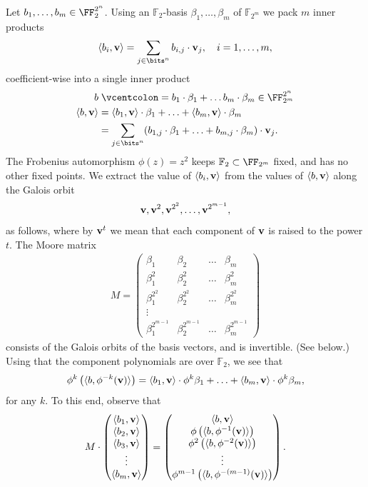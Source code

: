 \documentclass[11pt,letterpaper,usenames,dvipsnames]{article}
\begin{document}
Let $b_1,\ldots, b_m \in \FF_2^{2^n}$.
Using an $\mathbb F_2$-basis $\beta_1,\ldots, \beta_{m}$ of $\mathbb F_{2^m}$ we
pack $m$ inner products %
\[
\langle b_i, \vv\rangle = \sum_{j\in \bits^{n}} b_{i,j} \cdot \vv_j, 
\quad i = 1, \ldots, m,
\]
coefficient-wise into a single inner product 
\begin{align*}
b&\defeq b_1\cdot \beta_1 + \ldots b_m \cdot \beta_m \in \FF_{2^m}^{2^n}\\
\langle b, \vv\rangle &= \langle b_1, \vv\rangle \cdot \beta_1 + \ldots + \langle b_m, \vv\rangle \cdot\beta_m
\\
&= \sum_{j\in \bits^n} (b_{1,j}\cdot \beta_1 + \ldots + b_{m,j}\cdot \beta_{m}) \cdot \vv_j.
\end{align*}
%
The Frobenius automorphism $\phi(z) = z^2$ keeps $\mathbb F_2\subset \FF_{2^m}$ fixed, and has no other fixed points. 
We extract the value of $\langle b_i, \mathbf{v}\rangle$ from the values of $\langle b, \mathbf{v}\rangle$ along the Galois orbit 
\[
\mathbf{v}, \mathbf{v}^2, \mathbf{v}^{2^2}, \ldots, \mathbf{v}^{2^{m-1}},
\]
as follows, where by $\mathbf{v}^{t}$ we mean that each component of $\mathbf{v}$ is raised to the power $t$.
%
The Moore matrix
\begin{align*}
M = \begin{pmatrix}
\beta_1 & \beta_2 & \ldots & \beta_m
\\
\beta_1^2 & \beta_2^2 & \ldots & \beta_m^2
\\
\beta_1^{2^2} & \beta_2^{2^2} & \ldots & \beta_m^{2^2}
\\
\vdots
\\
\beta_1^{2^{m-1}} & \beta_2^{2^{m-1}} & \ldots & \beta_m^{2^{m-1}}
\end{pmatrix}
\end{align*}
consists of the Galois orbits of the basis vectors, and is invertible. (See below.)
Using that the component polynomials are over $\mathbb F_2$, we see that
\[
\phi^{k} \left(\langle b, \phi^{-k}(\mathbf{v})\rangle\right) =  \langle b_1, \mathbf{v}\rangle  \cdot \phi^{k}\beta_1 + \ldots + \langle b_m, \mathbf{v}\rangle   \cdot \phi^{k}\beta_m,
\]
for any $k$. 
%
To this end, observe that
\[
M \cdot\begin{pmatrix}
\langle b_1, \mathbf{v}\rangle  
\\
\langle b_2, \mathbf{v}\rangle  
\\
\langle b_3, \mathbf{v}\rangle  
\\
\vdots
\\
\langle b_m, \mathbf{v}\rangle  
\end{pmatrix}
=
\begin{pmatrix}
\langle b, \mathbf{v}\rangle
\\
\phi \left(\langle b, \phi^{-1}(\mathbf{v})\rangle\right)
\\
\phi^{2} \left(\langle b, \phi^{-2}(\mathbf{v})\rangle\right)
\\
\vdots
\\
\phi^{m-1} \left(\langle b, \phi^{-(m-1)}(\mathbf{v})\rangle\right)
\end{pmatrix}.
\]
\end{document}
